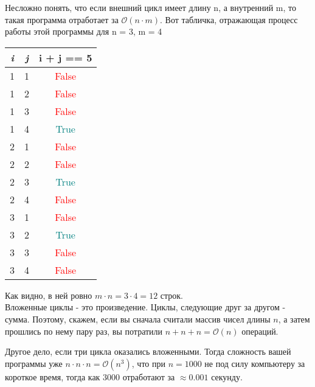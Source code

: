 \documentclass[12pt]{article} %
\def\O{\mathcal{O}}
\begin{document}
Несложно понять, что если внешний цикл имеет длину n, а внутренний m, то такая программа отработает за $\O(n \cdot m)$. Вот табличка, отражающая процесс работы этой программы для n = 3, m = 4
\begin{tabular}{|c|c|c|}
	\hline
	\textit{i} & \textit{j} & i + j == 5\\
	\hline
	\hline
	1 & 1 & \textcolor{red}{False}\\
	\hline
	1 & 2 & \textcolor{red}{False}\\
	\hline
	1 & 3 & \textcolor{red}{False}\\
	\hline
	1 & 4 & \textcolor{teal}{True}\\
	\hline
	2 & 1 & \textcolor{red}{False}\\
	\hline
	2 & 2 & \textcolor{red}{False}\\
	\hline
	2 & 3 & \textcolor{teal}{True}\\
	\hline
	2 & 4 & \textcolor{red}{False}\\
	\hline
	3 & 1 & \textcolor{red}{False}\\
	\hline
	3 & 2 & \textcolor{teal}{True}\\
	\hline
	3 & 3 & \textcolor{red}{False}\\
	\hline
	3 & 4 & \textcolor{red}{False}\\
	\hline
\end{tabular} Как видно, в ней ровно $m \cdot n = 3\cdot 4 = 12$ строк.\\

Вложенные циклы - это произведение. Циклы, следующие друг за другом - сумма. Поэтому, скажем, если вы сначала считали массив чисел длины $n$, а затем прошлись по нему пару раз, вы потратили $n + n + n = \O(n)$ операций. 
 
Другое дело, если три цикла оказались вложенными. Тогда сложность вашей программы уже $n \cdot n \cdot n = \O(n^3)$, что при $n = 1000$ не под силу компьютеру за короткое время, тогда как $3000$ отработают за $\approx0.001$ секунду.
\end{document}
